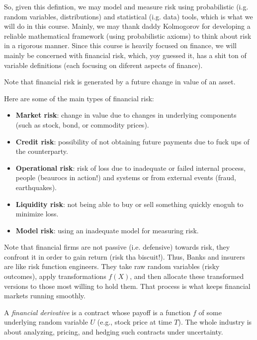 So, given this defintion, we may model and measure risk using probabilistic (i.g. random variables, distributions) and statistical (i.g. data) tools, which is what we will do in this course. Mainly, we may thank daddy Kolmogorov for developing
a reliable mathematical framework (using probabilistic axioms) to think about risk in a rigorous manner. Since this course is heavily focused on finance, we will mainly be concerned with financial risk, which, yoy guessed it, has a shit ton of
variable definitions (each focusing on diferent aspects of finance).

\begin{remark}
    Note that financial risk is generated by a future change in value of an asset.
\end{remark}

\vspace{0.2cm}

Here are some of the main types of financial risk:

\begin{itemize}
    \item \textbf{Market risk}: change in value due to changes in underlying components (such as
    stock, bond, or commodity prices).
    \item \textbf{Credit risk}: possibility of not obtaining future payments due to fuck ups of the counterparty.
    \item \textbf{Operational risk}: risk of loss due to inadequate or failed internal process, people (beaurocs in action!) and systems  or from external events (fraud, earthquakes).
    \item \textbf{Liquidity risk}: not being able to buy or sell something quickly enoguh to minimize loss.
    \item \textbf{Model risk}: using an inadequate model for measuring risk.
\end{itemize}

\vspace{0.2cm}

Note that financial firms are not passive (i.e. defensive) towards risk, they confront it in order to gain return (risk tha biscuit!). Thus, Banks and insurers are like risk function engineers. They take raw random variables (risky outcomes), apply transformations $f(X)$,
 and then allocate these transformed versions to those most willing to hold them. That process is what keeps financial markets running smoothly.

 \begin{definition}
    A \textit{financial derivative} is a contract whose payoff is a function $f$ of some underlying random variable $U$ (e.g., stock price at time $T$). The whole industry is about analyzing, pricing, and hedging such contracts under uncertainty.
 \end{definition}